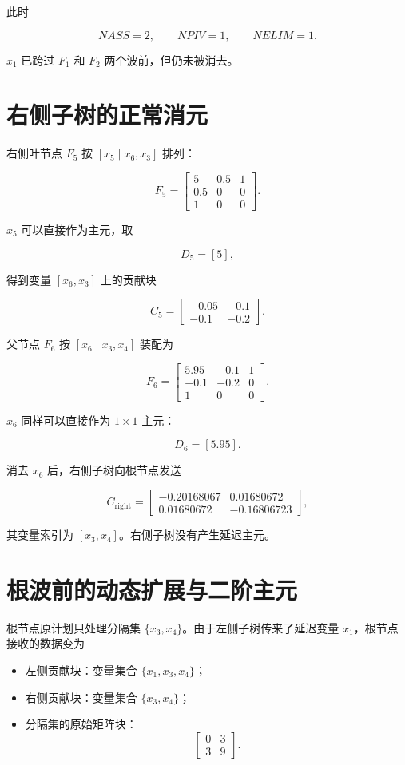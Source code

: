 此时

\[
NASS=2,
\qquad
NPIV=1,
\qquad
NELIM=1.
\]

$x_1$ 已跨过 $F_1$ 和 $F_2$ 两个波前，但仍未被消去。

\section{右侧子树的正常消元}

右侧叶节点 $F_5$ 按 $[x_5\mid x_6,x_3]$ 排列：

\[
F_5=
\begin{bmatrix}
5&0.5&1\\
0.5&0&0\\
1&0&0
\end{bmatrix}.
\]

$x_5$ 可以直接作为主元，取

\[
D_5=[5],
\]

得到变量 $[x_6,x_3]$ 上的贡献块

\[
C_5=
\begin{bmatrix}
-0.05&-0.1\\
-0.1&-0.2
\end{bmatrix}.
\]

父节点 $F_6$ 按 $[x_6\mid x_3,x_4]$ 装配为

\[
F_6=
\begin{bmatrix}
5.95&-0.1&1\\
-0.1&-0.2&0\\
1&0&0
\end{bmatrix}.
\]

$x_6$ 同样可以直接作为 $1\times1$ 主元：

\[
D_6=[5.95].
\]

消去 $x_6$ 后，右侧子树向根节点发送

\[
C_{\mathrm{right}}=
\begin{bmatrix}
-0.20168067&0.01680672\\
0.01680672&-0.16806723
\end{bmatrix},
\]

其变量索引为 $[x_3,x_4]$。右侧子树没有产生延迟主元。

\section{根波前的动态扩展与二阶主元}

根节点原计划只处理分隔集 $\{x_3,x_4\}$。由于左侧子树传来了延迟变量 $x_1$，根节点接收的数据变为

\begin{itemize}
  \item 左侧贡献块：变量集合 $\{x_1,x_3,x_4\}$；
  \item 右侧贡献块：变量集合 $\{x_3,x_4\}$；
  \item 分隔集的原始矩阵块：
  \[
  \begin{bmatrix}
  0&3\\
  3&9
  \end{bmatrix}.
  \]
\end{itemize}

